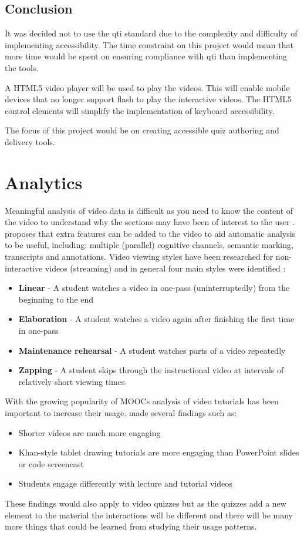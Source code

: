 \subsection*{Conclusion}
\label{Subsection: eAssessment Conclusion}
It was decided not to use the \gls{qti} standard due to the complexity and difficulty of implementing accessibility. The time constraint on this project would mean that more time would be spent on ensuring compliance with \gls{qti} than implementing the tools.

A HTML5 video player will be used to play the videos. This will enable mobile devices that no longer support flash to play the interactive videos. The HTML5 control elements will simplify the implementation of keyboard accessibility.

The focus of this project would be on creating accessible quiz authoring and delivery tools.

\section{Analytics}
\label{Section:Analytics}
Meaningful analysis of video data is difficult as you need to know the content of the video to understand why the sections may have been of interest to the user \citep{videoLectures}.  proposes that extra features can be added to the video to aid automatic analysis to be useful, including: multiple (parallel) cognitive channels, semantic marking, transcripts and annotations. Video viewing styles have been researched for non-interactive videos (streaming) and in general four main styles were identified \citep{DeBoer}:
\begin{itemize}
\item \textbf{Linear} - A student watches a video in one-pass (uninterruptedly) from the beginning to the end
\item \textbf{Elaboration} - A student watches a video again after finishing the first time in one-pass
\item \textbf{Maintenance rehearsal} - A student watches parts of a video repeatedly
\item \textbf{Zapping} - A student skips through the instructional video at intervals of relatively short viewing times
\end{itemize}

With the growing popularity of \glspl{MOOC} analysis of video tutorials has been important to increase their usage.  made several findings such as:
\begin{itemize}
\item Shorter videos are much more engaging
\item Khan-style tablet drawing tutorials are more engaging than PowerPoint slides or code screencast
\item Students engage differently with lecture and tutorial videos
\end{itemize}
These findings would also apply to video quizzes but as the quizzes add a new element to the material the interactions will be different and there will be many more things that could be learned from studying their usage patterns.

